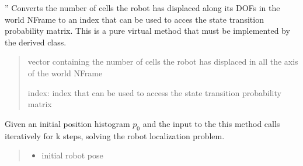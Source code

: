 \documentclass[letterpaper,10pt,english]{sphinxmanual}
\begin{document}
\begin{fulllineitems}
\begin{fulllineitems}
\end{fulllineitems}


\begin{fulllineitems}
\label{\detokenize{GridLocalization:GL.GL.uk2cell}}
\pysigstartsignatures
{}
\pysigstopsignatures
\sphinxAtStartPar
”
Converts the number of cells the robot has displaced along its DOFs in the world N\sphinxhyphen{}Frame to an index that can be
used to acces the state transition probability matrix.
This is a pure virtual method that must be implemented by the derived class.
\begin{quote}\begin{description}
\sphinxAtStartPar
{} \textendash{} vector containing the number of cells the robot has displaced in all the axis of the world N\sphinxhyphen{}Frame

\sphinxAtStartPar
index: index that can be used to access the state transition probability matrix

\end{description}\end{quote}

\end{fulllineitems}


\begin{fulllineitems}
\label{\detokenize{GridLocalization:GL.GL.LocalizationLoop}}
\pysigstartsignatures
{}
\pysigstopsignatures
\sphinxAtStartPar
Given an initial position histogram \(p_0\) and the input to the 
this method calls iteratively {\hyperref[\detokenize{GridLocalization:GL.GL.Localize}]{}} for k steps, solving the robot localization problem.
\begin{quote}\begin{description}
\begin{itemize}
\item {} 
\sphinxAtStartPar
{} \textendash{} initial robot pose


\end{itemize}
\end{description}
\end{quote}
\end{fulllineitems}
\end{fulllineitems}
\end{document}
